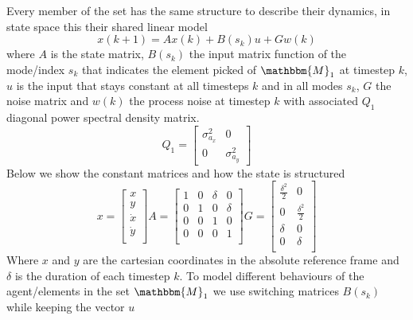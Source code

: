\documentclass[twocolumn]{article}
\begin{document}
Every member of the set has the same structure
to describe their dynamics, in state space this their shared linear model
\begin{equation}
    x(k+1)= Ax(k) + B(s_{k})u + Gw(k)
\end{equation}
where $A$ is the state matrix, $B(s_{k})$ the input matrix function of the mode/index $s_{k}$ that indicates the element picked of $\mathbbm{M}_{1}$ at timestep $k$,
$u$ is the input that stays constant at all timesteps $k$ and in all modes $s_{k}$, $G$ the noise matrix and $w(k)$ the process noise at timestep
$k$ with associated $Q_{1}$ diagonal power spectral density matrix.
\begin{equation*}
    Q_{1}=\begin{bmatrix}
        \sigma^{2}_{a_{x}} & 0                  \\
        0                  & \sigma^{2}_{a_{y}}
    \end{bmatrix}
\end{equation*}
Below we show the constant matrices and how the state is structured
\[ x=\begin{bmatrix} x \\ y \\ \dot{x} \\ \dot{y} \\ \end{bmatrix}  A=\begin{bmatrix}
        1 & 0 & \delta & 0      \\
        0 & 1 & 0      & \delta \\
        0 & 0 & 1      & 0      \\
        0 & 0 & 0      & 1      \\
    \end{bmatrix}
    G=\begin{bmatrix}
        \frac{\delta^{2}}{2} & 0                    \\
        0                    & \frac{\delta^{2}}{2} \\
        \delta               & 0                    \\
        0                    & \delta               \\
    \end{bmatrix}
\]
Where $x$ and $y$ are the cartesian coordinates in the absolute reference frame and $\delta$ is the duration of each timestep $k$.
To model different behaviours of the agent/elements in the set $\mathbbm{M}_{1}$ we use switching matrices $B(s_{k})$ while keeping the vector $u$
\end{document}
